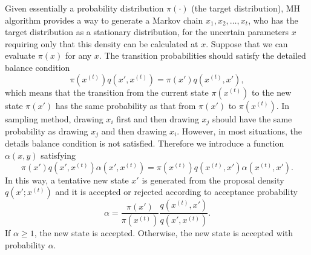 Given essentially a probability distribution $\pi(\cdot)$ (the target distribution), MH algorithm provides a way to generate a Markov chain $x_1, x_2,\ldots, x_t$, who has the target distribution as a stationary distribution, for the uncertain parameters $x$ requiring only that this density can be calculated at $x$. Suppose that we can evaluate $\pi(x)$ for any $x$. The transition probabilities should satisfy the detailed balance condition
\begin{equation*}
\pi\left(x^{(t)}\right)q\left(x', x^{(t)}\right) = \pi\left(x'\right)q\left(x^{(t)}, x'\right),
\end{equation*}
which means that the transition from the current state $\pi(x^{(t)})$ to the new state $\pi(x')$ has the same probability as that from $\pi(x')$ to $\pi(x^{(t)})$. In sampling method, drawing $x_i$ first and then drawing $x_j$ should have the same probability as drawing $x_j$ and then drawing $x_i$. However, in most situations, the details balance condition is not satisfied. Therefore we introduce a function $\alpha(x,y)$ satisfying 
\begin{equation*}
\pi\left(x'\right)q\left(x', x^{\left(t\right)}\right)\alpha\left(x',x^{\left(t\right)}\right) = \pi\left(x^{\left(t\right)}\right)q\left(x^{\left(t\right)}, x'\right)\alpha\left(x^{\left(t\right)},x'\right).
\end{equation*}
In this way, a tentative new state $x'$ is generated from the proposal density $q\left(x';x^{\left(t\right)}\right)$ and it is accepted or rejected according to acceptance probability 
\begin{equation}\label{alphabalance}
\alpha=\frac{\pi\left(x'\right)}{\pi\left(x^{\left(t\right)}\right)}\frac{q\left(x^{\left(t\right)}, x'\right)}{q\left(x', x^{\left(t\right)}\right)}.
\end{equation}
If $\alpha \geq 1$, the new state is accepted. Otherwise, the new state is accepted with probability $\alpha$.

